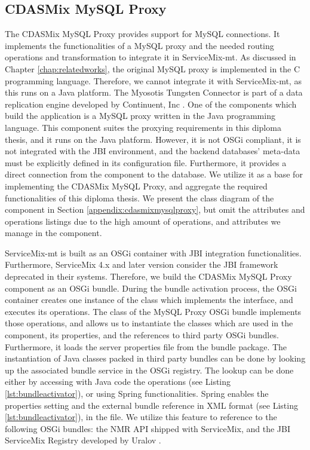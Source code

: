 \subsection{CDASMix MySQL Proxy}
The CDASMix MySQL Proxy provides support for MySQL connections. It implements the functionalities of a MySQL proxy and the needed routing operations and transformation to  integrate it in ServiceMix-mt. As discussed in Chapter \ref{chap:relatedworks}, the original MySQL proxy is implemented in the C programming language. Therefore, we cannot integrate it with ServiceMix-mt, as this runs on a Java platform. The Myosotis Tungsten Connector is part of a data replication engine developed by Continuent, Inc \cite{tungstenwiki}. One of the components which build the application is a MySQL proxy written in the Java programming language. This component suites the proxying requirements in this diploma thesis, and it runs on the Java platform. However, it is not \ac{OSGi} compliant, it is not integrated with the \ac{JBI} environment, and the backend databases' meta-data must be explicitly defined in its configuration file. Furthermore, it provides a direct connection from the component to the database. We utilize it as a base for implementing the CDASMix MySQL Proxy, and aggregate the required functionalities of this diploma thesis. We present the class diagram of the component in Section \ref{appendix:cdasmixmysqlproxy}, but omit the attributes and operations listings due to the high amount of operations, and attributes we manage in the component.

ServiceMix-mt is built as an \ac{OSGi} container with \ac{JBI} integration functionalities. Furthermore, ServiceMix 4.x and later version consider the \ac{JBI} framework deprecated in their systems. Therefore, we build the CDASMix MySQL Proxy component as an \ac{OSGi} bundle. During the bundle activation process, the \ac{OSGi} container creates one instance of the class which implements the  interface, and executes its operations. The class  of the MySQL Proxy \ac{OSGi} bundle implements those operations, and allows us to instantiate the classes which are used in the component, its properties, and the references to third party \ac{OSGi} bundles. Furthermore, it loads the server properties file from the bundle package. The instantiation of Java classes packed in third party bundles can be done by looking up the associated bundle service in the \ac{OSGi} registry. The lookup can be done either by accessing with Java code the  operations (see Listing \ref{lst:bundleactivator}), or using Spring functionalities. Spring enables the properties setting and the external bundle reference in \ac{XML} format (see Listing \ref{lst:bundleactivator}), in the  file. We utilize this feature to reference to the following \ac{OSGi} bundles: the \ac{NMR} \ac{API} shipped with ServiceMix, and the \ac{JBI} ServiceMix Registry developed by Uralov \cite{Uralov2012}. 

